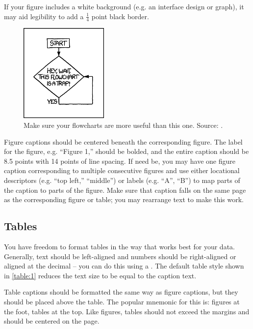 {{{{If your figure includes a white background (e.g. an interface design or graph), it may aid legibility to add a $\frac{1}{4}$ point black border.

\begin{figure}[H]
  \centering
  \includegraphics[scale=0.95]{figs/example-image2}
  \caption{Make sure your flowcharts are more useful than this one. Source: .}
  \label{fig::2}
\end{figure}

Figure captions should be centered beneath the corresponding figure. The label for the figure, e.g. “Figure 1,” should be bolded, and the entire caption should be 8.5 points with 14 points of line spacing. If need be, you may have one figure caption corresponding to multiple consecutive figures and use either locational descriptors (e.g. “top left,” “middle”) or labels (e.g. “A”, “B”) to map parts of the caption to parts of the figure. Make sure that caption falls on the same page as the corresponding figure or table; you may rearrange text to make this work.

\subsection{Tables}
You have freedom to format tables in the way that works best for your data. Generally, text should be left-aligned and numbers should be right-aligned or aligned at the decimal – you can do this using a . The default table style shown in \autoref{table:1} reduces the text size to be equal to the caption text.

Table captions should be formatted the same way as figure captions, but they should be placed above the table. The popular mnemonic for this is: figures at the foot, tables at the top. Like figures, tables should not exceed the margins and should be centered on the page.

}}}}
